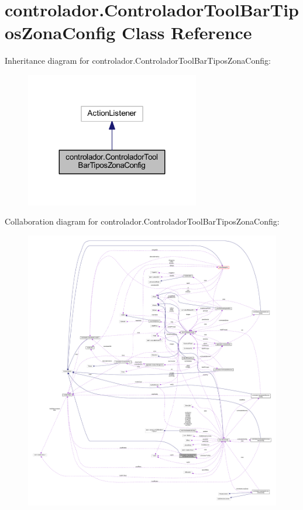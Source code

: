 \hypertarget{classcontrolador_1_1_controlador_tool_bar_tipos_zona_config}{}\section{controlador.\+Controlador\+Tool\+Bar\+Tipos\+Zona\+Config Class Reference}
\label{classcontrolador_1_1_controlador_tool_bar_tipos_zona_config}


Inheritance diagram for controlador.\+Controlador\+Tool\+Bar\+Tipos\+Zona\+Config\+:
\nopagebreak
\begin{figure}[H]
\begin{center}
\leavevmode
\includegraphics[width=215pt]{classcontrolador_1_1_controlador_tool_bar_tipos_zona_config__inherit__graph}
\end{center}
\end{figure}


Collaboration diagram for controlador.\+Controlador\+Tool\+Bar\+Tipos\+Zona\+Config\+:
\nopagebreak
\begin{figure}[H]
\begin{center}
\leavevmode
\includegraphics[width=350pt]{classcontrolador_1_1_controlador_tool_bar_tipos_zona_config__coll__graph}
\end{center}
\end{figure}
